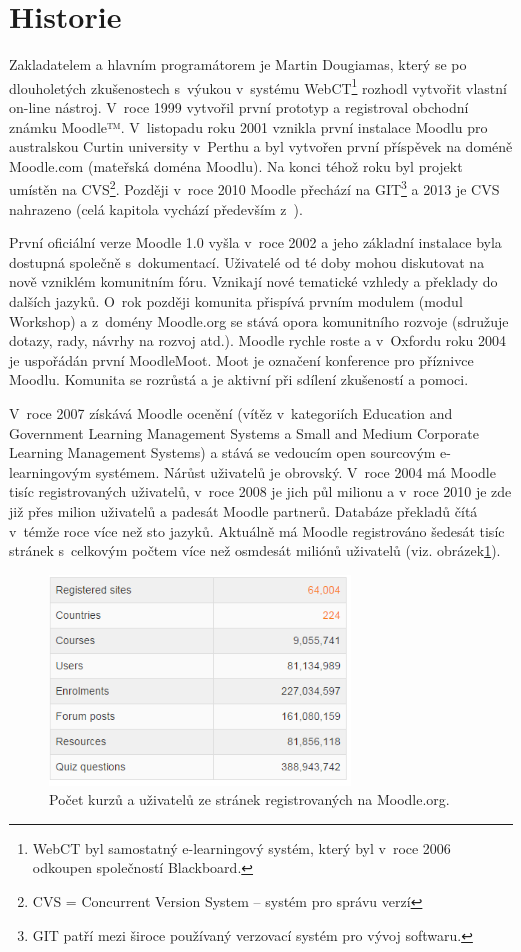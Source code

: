 \documentclass[
print,
  11pt,
  table,   
  nolof,    
  nolot,
  oneside,
  draft
]{fithesis3}
\begin{document}
	\section{Historie}
Zakladatelem a hlavním programátorem je Martin Dougiamas, který se po dlouholetých zkušenostech s~výukou v~systému WebCT\footnote{WebCT byl samostatný e-learningový systém, který byl v~roce 2006 odkoupen společností Blackboard.}  rozhodl vytvořit vlastní on-line nástroj. V~roce 1999 vytvořil první prototyp a registroval obchodní známku Moodle™. V~listopadu roku 2001 vznikla první instalace Moodlu pro australskou Curtin university v~Perthu a byl vytvořen první příspěvek na doméně Moodle.com (mateřská doména Moodlu).  Na konci téhož roku byl projekt umístěn na CVS\footnote{CVS = Concurrent Version System -- systém pro správu verzí}. Později v~roce 2010 Moodle přechází na GIT\footnote{GIT patří mezi široce používaný verzovací systém pro vývoj softwaru.}  a 2013 je CVS nahrazeno (celá kapitola vychází především z~\cite{history}).

První oficiální verze Moodle 1.0 vyšla v~roce 2002 a jeho základní instalace byla dostupná společně s~dokumentací. Uživatelé od té doby mohou diskutovat na nově vzniklém komunitním fóru. Vznikají nové tematické vzhledy a překlady do dalších jazyků. O~rok později komunita přispívá prvním modulem (modul Workshop) a z~domény Moodle.org se stává opora komunitního rozvoje (sdružuje dotazy, rady, návrhy na rozvoj atd.). Moodle rychle roste a v~Oxfordu roku 2004 je uspořádán první MoodleMoot. Moot je označení konference pro příznivce Moodlu. Komunita se rozrůstá a je aktivní při sdílení zkušeností a pomoci.

V~roce 2007 získává Moodle ocenění (vítěz v~kategoriích Education and Government Learning Management Systems a Small and Medium Corporate Learning Management Systems) a stává se vedoucím open sourcovým e-learningovým systémem. Nárůst uživatelů je obrovský. V~roce 2004 má Moodle tisíc registrovaných uživatelů, v~roce 2008 je jich půl milionu a v~roce 2010 je zde již přes milion uživatelů a padesát Moodle partnerů. Databáze překladů čítá v~témže roce více než sto jazyků. Aktuálně má Moodle registrováno šedesát tisíc stránek s~celkovým počtem více než osmdesát miliónů uživatelů (viz. obrázek\ref{fig:moodlestats}). 
 \begin{figure}
		  \begin{center}
		    \includegraphics[width=80mm]{images/statistiky-moodle.png}
		   \end{center}
		  \caption{Počet kurzů a uživatelů ze stránek registrovaných na Moodle.org.   \cite{moodle-stats}}
		  \label{fig:moodlestats}
		\end{figure}
\end{document}
